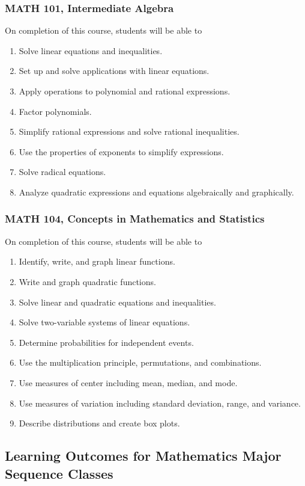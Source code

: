 \documentclass[11pt]{article}
\newenvironment{alphalist}{
\begin{enumerate}[label=(\arabic*),widest=107 ,leftmargin=25pt, itemsep=0pt]}
{\end{enumerate}}
\begin{document}
\subsubsection{MATH 101, Intermediate Algebra}

On completion of this course, students will  be able to 
\begin{alphalist}
\item  Solve linear equations and inequalities.
\item  Set up and solve applications with linear equations.
\item  Apply operations to polynomial and rational expressions.
\item  Factor polynomials.
\item  Simplify rational expressions and solve rational inequalities.
\item  Use the properties of exponents to simplify expressions.
\item  Solve radical equations.
\item Analyze quadratic expressions and equations algebraically and graphically.
\end{alphalist}
\subsubsection{MATH 104, Concepts in Mathematics and Statistics}


On completion of this course, students will be able to
\begin{alphalist}
    \item Identify, write, and graph linear functions.
    \item Write and graph quadratic functions.
    \item Solve linear and quadratic equations and inequalities.
    \item Solve two-variable systems of linear equations.
    \item Determine probabilities for independent events.
    \item Use the multiplication principle, permutations, and combinations.
    \item Use measures of center including mean, median, and mode.
    \item Use measures of variation including standard deviation, range, and variance.
    \item Describe distributions and create box plots.
\end{alphalist}

\subsection{Learning Outcomes for Mathematics Major Sequence Classes}
\end{document}
